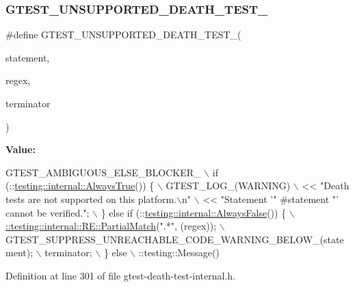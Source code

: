 \subsubsection{\texorpdfstring{G\+T\+E\+S\+T\+\_\+\+U\+N\+S\+U\+P\+P\+O\+R\+T\+E\+D\+\_\+\+D\+E\+A\+T\+H\+\_\+\+T\+E\+S\+T\+\_\+}{GTEST\_UNSUPPORTED\_DEATH\_TEST\_}}
{\footnotesize\ttfamily \#define G\+T\+E\+S\+T\+\_\+\+U\+N\+S\+U\+P\+P\+O\+R\+T\+E\+D\+\_\+\+D\+E\+A\+T\+H\+\_\+\+T\+E\+S\+T\+\_\+(\begin{DoxyParamCaption}\item[{}]{statement,  }\item[{}]{regex,  }\item[{}]{terminator }\end{DoxyParamCaption})}

{\bfseries Value\+:}
\begin{DoxyCode}
GTEST\_AMBIGUOUS\_ELSE\_BLOCKER\_ \(\backslash\)
    if (::\hyperlink{namespacetesting_1_1internal_a922c9da63cd4bf94fc473b9ecac76414}{testing::internal::AlwaysTrue}()) \{ \(\backslash\)
      GTEST\_LOG\_(WARNING) \(\backslash\)
          << \textcolor{stringliteral}{"Death tests are not supported on this platform.\(\backslash\)n"} \(\backslash\)
          << \textcolor{stringliteral}{"Statement '"} #statement \textcolor{stringliteral}{"' cannot be verified."}; \(\backslash\)
    \} \textcolor{keywordflow}{else} \textcolor{keywordflow}{if} (::\hyperlink{namespacetesting_1_1internal_a4b24c851ab13569b1b15b3d259b60d2e}{testing::internal::AlwaysFalse}()) \{ 
      \hyperlink{classtesting_1_1internal_1_1RE_a1e81f9a87211bdca645e025f8f0236c8}{\(\backslash\)}
\hyperlink{classtesting_1_1internal_1_1RE_a1e81f9a87211bdca645e025f8f0236c8}{      ::testing::internal::RE::PartialMatch}(\textcolor{stringliteral}{".*"}, (regex)); \(\backslash\)
      GTEST\_SUPPRESS\_UNREACHABLE\_CODE\_WARNING\_BELOW\_(statement); \(\backslash\)
      terminator; \(\backslash\)
    \} else \(\backslash\)
      ::testing::Message()
\end{DoxyCode}


Definition at line 301 of file gtest-\/death-\/test-\/internal.\+h.

